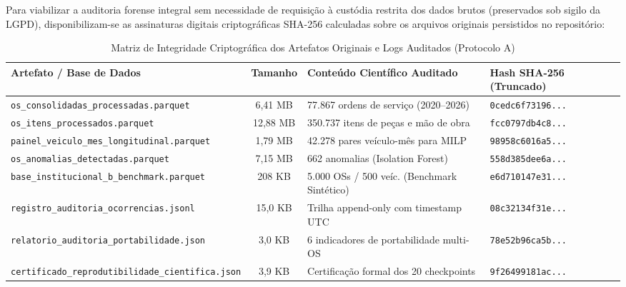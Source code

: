 Para viabilizar a auditoria forense integral sem necessidade de requisição à custódia restrita dos dados brutos (preservados sob sigilo da LGPD), disponibilizam-se as assinaturas digitais criptográficas SHA-256 calculadas sobre os arquivos originais persistidos no repositório:

\begin{table}[H]
\centering
\small
\caption{Matriz de Integridade Criptográfica dos Artefatos Originais e Logs Auditados (Protocolo A)}
\label{tab:integridade_artefatos}
\begin{tabularx}{\textwidth}{l c X l}
\toprule
\textbf{Artefato / Base de Dados} & \textbf{Tamanho} & \textbf{Conteúdo Científico Auditado} & \textbf{Hash SHA-256 (Truncado)} \\
\midrule
\texttt{os\_consolidadas\_processadas.parquet} & 6,41 MB & 77.867 ordens de serviço (2020--2026) & \texttt{0cedc6f73196...} \\
\texttt{os\_itens\_processados.parquet} & 12,88 MB & 350.737 itens de peças e mão de obra & \texttt{fcc0797db4c8...} \\
\texttt{painel\_veiculo\_mes\_longitudinal.parquet} & 1,79 MB & 42.278 pares veículo-mês para MILP & \texttt{98958c6016a5...} \\
\texttt{os\_anomalias\_detectadas.parquet} & 7,15 MB & 662 anomalias (Isolation Forest) & \texttt{558d385dee6a...} \\
\texttt{base\_institucional\_b\_benchmark.parquet} & 208 KB & 5.000 OSs / 500 veíc. (Benchmark Sintético) & \texttt{e6d710147e31...} \\
\texttt{registro\_auditoria\_ocorrencias.jsonl} & 15,0 KB & Trilha append-only com timestamp UTC & \texttt{08c32134f31e...} \\
\texttt{relatorio\_auditoria\_portabilidade.json} & 3,0 KB & 6 indicadores de portabilidade multi-OS & \texttt{78e52b96ca5b...} \\
\texttt{certificado\_reprodutibilidade\_cientifica.json} & 3,9 KB & Certificação formal dos 20 checkpoints & \texttt{9f26499181ac...} \\
\bottomrule
\end{tabularx}
\end{table}

